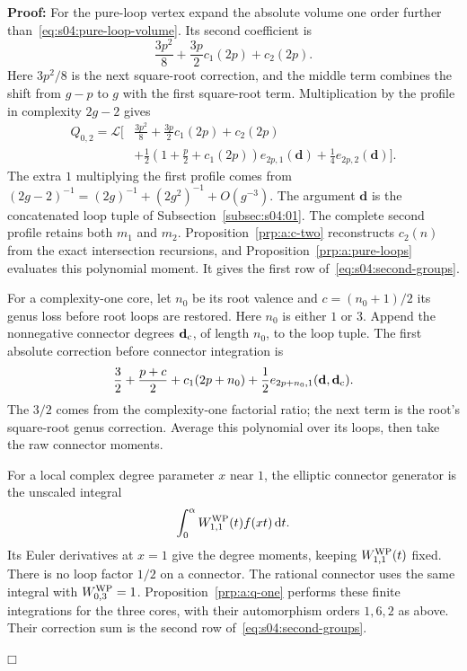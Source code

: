 \documentclass[a4paper,10pt]{article}
\numberwithin{equation}{section}
\newcommand{\dd}{\mathrm{d}}
\theoremstyle{paperplain}
\theoremstyle{paperremark}
\theoremstyle{paperplain}
\newenvironment{prf}{\noindent \textbf{Proof: }}{\hfill $\mdlgwhtsquare$\par\addvspace{0.5\baselineskip}}
\begin{document}
\begin{prf}
For the pure-loop vertex expand the absolute volume one order further
than~\eqref{eq:s04:pure-loop-volume}. Its second coefficient is
\[
 \frac{3p^2}{8}+\frac{3p}{2}c_1(2p)+c_2(2p).
\]
Here $3p^2/8$ is the next square-root correction, and the middle
term combines the shift from $g-p$ to $g$ with the first square-root
term. Multiplication by the profile in complexity $2g-2$ gives
\begin{equation}\label{eq:s04:q-zero-mechanism}
\begin{aligned}
 Q_{0,2}=\mathcal L\biggl[&\frac{3p^2}{8}
   +\frac{3p}{2}c_1(2p)+c_2(2p)\\
 &+\frac12\left(1+\frac p2+c_1(2p)\right)e_{2p,1}(\mathbf d)
       +\frac14e_{2p,2}(\mathbf d)\biggr].
\end{aligned}
\end{equation}
The extra $1$ multiplying the first profile comes from
$(2g-2)^{-1}=(2g)^{-1}+(2g^2)^{-1}+O(g^{-3})$.
The argument $\mathbf d$ is the concatenated loop tuple of
Subsection~\ref{subsec:s04:01}. The complete second profile retains
both $m_1$ and $m_2$. Proposition~\ref{prp:a:c-two} reconstructs
$c_2(n)$ from the exact intersection recursions, and
Proposition~\ref{prp:a:pure-loops} evaluates this polynomial moment.
It gives the first row of~\eqref{eq:s04:second-groups}.

For a complexity-one core, let $n_0$ be its root valence and
$c=(n_0+1)/2$ its genus loss before root loops are restored.
Here $n_0$ is either $1$ or $3$. Append the nonnegative connector
degrees $\mathbf d_{\rm c}$, of length $n_0$, to the loop tuple.
The first absolute correction before connector integration is
\begin{equation}\label{eq:s04:q-one-mechanism}
 \frac32+\frac{p+c}{2}+c_1(2p+n_0)
       +\frac12e_{2p+n_0,1}(\mathbf d,\mathbf d_{\rm c}).
\end{equation}
The $3/2$ comes from the complexity-one factorial ratio; the next
term is the root's square-root genus correction. Average this
polynomial over its loops, then take the raw connector moments.

For a local complex degree parameter $x$ near $1$, the elliptic
connector generator is the unscaled integral
\[
 \int_0^\alpha W^{\rm WP}_{1,1}(t)f(xt)\,\dd t.
\]
Its Euler derivatives at $x=1$ give the degree moments, keeping
$W^{\rm WP}_{1,1}(t)$ fixed. There is no loop factor $1/2$ on a
connector. The rational connector uses the same integral with
$W^{\rm WP}_{0,3}=1$. Proposition~\ref{prp:a:q-one} performs these
finite integrations for the three cores, with their automorphism
orders $1,6,2$ as above. Their correction sum is the second row
of~\eqref{eq:s04:second-groups}.


\end{prf}
\end{document}
